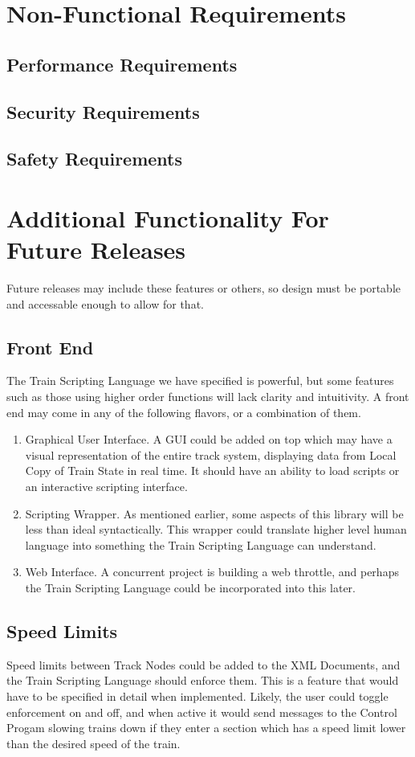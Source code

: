 \documentclass[a4paper,11pt,notitlepage]{article}
\def\TSL{Train Scripting Language\xspace}
\def\CS{Control Progam\xspace}
\def\LC{Local Copy of Train State\xspace}
\def\TN{Track Node\xspace}
\begin{document}
\newpage
\section{Non-Functional Requirements}
\subsection{Performance Requirements}
\subsection{Security Requirements}
\subsection{Safety Requirements}

\newpage
\section{Additional Functionality For Future Releases}
Future releases may include these features or others, so design must be portable and accessable enough to allow for that.
\subsection{Front End}
The \TSL we have specified is powerful, but some features such as those using higher order functions will lack clarity and intuitivity. A front end may come in any of the following flavors, or a combination of them.
\begin{enumerate}
	\item Graphical User Interface. A GUI could be added on top which may have a visual representation of the entire track system, displaying data from \LC in real time. It should have an ability to load scripts or an interactive scripting interface.
	\item Scripting Wrapper. As mentioned earlier, some aspects of this library will be less than ideal syntactically. This wrapper could translate higher level human language into something the \TSL can understand.
	\item Web Interface. A concurrent project is building a web throttle, and perhaps the \TSL could be incorporated into this later.
\end{enumerate}
\subsection{Speed Limits}
Speed limits between \TN{}s could be added to the XML Documents, and the \TSL should enforce them. This is a feature that would have to be specified in detail when implemented. Likely, the user could toggle enforcement on and off, and when active it would send messages to the \CS slowing trains down if they enter a section which has a speed limit lower than the desired speed of the train.
\end{document}
